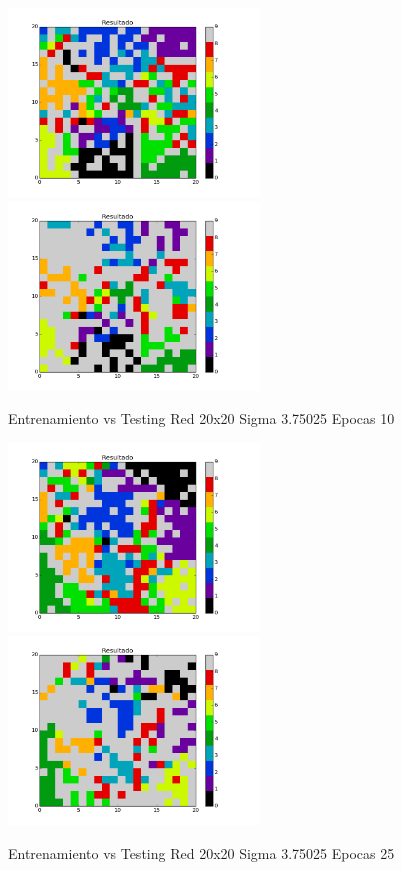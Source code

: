\includegraphics[width=0.5\textwidth]{img/Ej2_Epocas/train_M_20_sigma_3_75025_epocas_10}
\includegraphics[width=0.5\textwidth]{img/Ej2_Epocas/test_M_20_sigma_3_75025_epocas_10}
{\center \footnotesize Entrenamiento vs Testing Red 20x20 Sigma 3.75025 Epocas 10\par}

\includegraphics[width=0.5\textwidth]{img/Ej2_Epocas/train_M_20_sigma_3_75025_epocas_25}
\includegraphics[width=0.5\textwidth]{img/Ej2_Epocas/test_M_20_sigma_3_75025_epocas_25}
{\center \footnotesize Entrenamiento vs Testing Red 20x20 Sigma 3.75025 Epocas 25\par}

